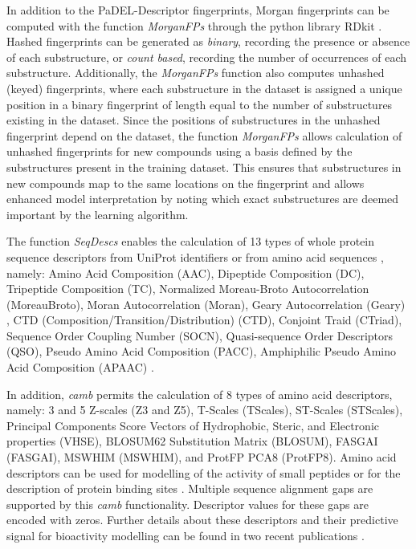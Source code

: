 \documentclass{bmcart}
\begin{document}
In addition to the PaDEL-Descriptor fingerprints, Morgan fingerprints can be computed with the function {\it MorganFPs}
through the python library RDkit \cite{rdkit}.
Hashed fingerprints can be generated as \textit{binary}, recording the presence or absence of each substructure,
or \textit{count based}, recording the number of occurrences of each substructure.
Additionally, the {\it MorganFPs} function also computes unhashed (keyed) fingerprints, 
where each substructure in the dataset is assigned a unique position in a binary fingerprint of length equal to the number of substructures existing in the dataset.
Since the positions of substructures in the unhashed fingerprint depend on the dataset, the function {\it MorganFPs} allows calculation of unhashed fingerprints for new compounds using a basis defined by the substructures present in the training dataset.
This ensures that substructures in new compounds map to the same locations on the fingerprint and allows enhanced model interpretation by noting which exact substructures are deemed important by the learning algorithm.

The function {\it SeqDescs} enables the calculation of 13 types of whole protein sequence descriptors
from UniProt identifiers or from amino acid sequences \cite{protr}, namely:
Amino Acid Composition (AAC), Dipeptide Composition (DC), Tripeptide Composition (TC), Normalized Moreau-Broto Autocorrelation (MoreauBroto), Moran Autocorrelation (Moran), Geary Autocorrelation (Geary) , CTD (Composition/Transition/Distribution) (CTD), Conjoint Traid (CTriad), Sequence Order Coupling Number (SOCN), Quasi-sequence Order Descriptors (QSO), Pseudo Amino Acid Composition (PACC), Amphiphilic Pseudo Amino Acid Composition (APAAC) \cite{aadescs2,aadescs1}.

In addition, {\it camb} permits the calculation of 8 types of amino acid descriptors, namely:
3 and 5 Z-scales (Z3 and Z5), T-Scales (TScales), ST-Scales (STScales), 
Principal Components Score Vectors of Hydrophobic, Steric, and Electronic properties (VHSE), 
BLOSUM62 Substitution Matrix (BLOSUM), FASGAI (FASGAI), MSWHIM (MSWHIM), and ProtFP PCA8 (ProtFP8).
Amino acid descriptors can be used for modelling of the activity of small peptides
or for the description of protein binding sites \cite{AA_benchmark,adenosine,cortesCOX,cortesReview}.
Multiple sequence alignment gaps are supported by this {\it camb} functionality.
Descriptor values for these gaps are encoded with zeros.
Further details about these descriptors and their predictive signal
for bioactivity modelling can be found in two recent publications \cite{AA_benchmark1,AA_benchmark}.
\end{document}
